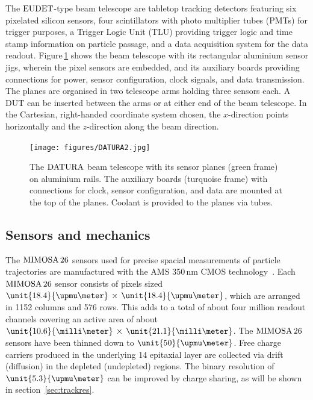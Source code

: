 
The $\textrm{EUDET}$-type beam telescope are tabletop tracking detectors featuring six pixelated silicon sensors, four scintillators with photo multiplier tubes (PMTs) for trigger purposes,
 a Trigger Logic Unit (TLU) providing trigger logic and time stamp information on particle passage, and a data acquisition system for the data readout. 
Figure\,\ref{fig:datura-tscope} shows the beam telescope with its rectangular aluminium sensor jigs, wherein the pixel sensors are embedded,
 and its auxiliary boards providing connections for power, sensor configuration, clock signals, and data transmission. 
The planes are organised in two telescope arms holding three sensors each. 
A DUT can be inserted between the arms or at either end of the beam telescope. 
In the Cartesian, right-handed coordinate system chosen, the $x$-direction points horizontally and the $z$-direction along the beam direction.

\begin{figure}[tb]
	\center
	\texttt{[image: figures/DATURA2.jpg]}
	\caption[The $\Datura$ telescope]{The $\Datura$ beam telescope with its sensor planes (green frame) on aluminium rails.
	The auxiliary boards (turquoise frame) with connections for clock, sensor configuration, and data are mounted at the top of the planes.
	Coolant is provided to the planes via tubes.}
	\label{fig:datura-tscope}
\end{figure}
 
\subsection{Sensors and mechanics}
\label{sec:sensors}

The $\textrm{MIMOSA\,26}$ sensors used for precise spacial measurements of particle trajectories are manufactured with the AMS 350\,nm CMOS technology~\cite{HuGuo2010480}. 
Each $\textrm{MIMOSA\,26}$ sensor consists of pixels sized $\unit{18.4}{\upmu\meter}\,\times\,\unit{18.4}{\upmu\meter}$, which are arranged in 1152 columns and 576 rows.
This adds to a total of about four million readout channels covering an active area of about $\unit{10.6}{\milli\meter}\,\times\,\unit{21.1}{\milli\meter}$. 
The $\textrm{MIMOSA\,26}$ sensors have been thinned down to $\unit{50}{\upmu\meter}$. 
Free charge carriers produced in the underlying \unit{14}{\upmu\meter} epitaxial layer are collected via drift (diffusion) in the depleted (undepleted) regions. 
The binary resolution of $\unit{5.3}{\upmu\meter}$ can be improved by charge sharing, as will be shown in section~\ref{sec:trackres}.

